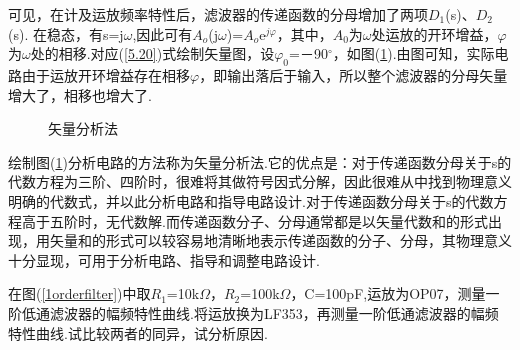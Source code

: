 \documentclass[a4paper]{article}
\begin{document}
可见，在计及运放频率特性后，滤波器的传递函数的分母增加了两项$D_1$(s)、$D_2$(s).
在稳态，有s=j$\omega$,因此可有$A_o$(j$\omega$)=$A_o$e$^{j\varphi}$，其中，$A_0$为$\omega$处运放的开环增益，$\varphi$为$\omega$处的相移.对应(\ref{5.20})式绘制矢量图，设$\varphi_0$=－90$^\circ$，如图(\ref{vecAnalyMethod}).由图可知，实际电路由于运放开环增益存在相移$\varphi$，即输出落后于输入，所以整个滤波器的分母矢量增大了，相移也增大了.
\begin{figure}[!h]
\centering
{}
\caption{矢量分析法}\label{vecAnalyMethod}
\end{figure}
绘制图(\ref{vecAnalyMethod})分析电路的方法称为矢量分析法.它的优点是：对于传递函数分母关于s的代数方程为三阶、四阶时，很难将其做符号因式分解，因此很难从中找到物理意义明确的代数式，并以此分析电路和指导电路设计.对于传递函数分母关于s的代数方程高于五阶时，无代数解.而传递函数分子、分母通常都是以矢量代数和的形式出现，用矢量和的形式可以较容易地清晰地表示传递函数的分子、分母，其物理意义十分显现，可用于分析电路、指导和调整电路设计.

在图(\ref{1orderfilter})中取$R_1$=10k$\Omega$，$R_2$=100k$\Omega$，C=100pF,运放为OP07，测量一阶低通滤波器的幅频特性曲线.将运放换为LF353，再测量一阶低通滤波器的幅频特性曲线.试比较两者的同异，试分析原因.
\end{document}
